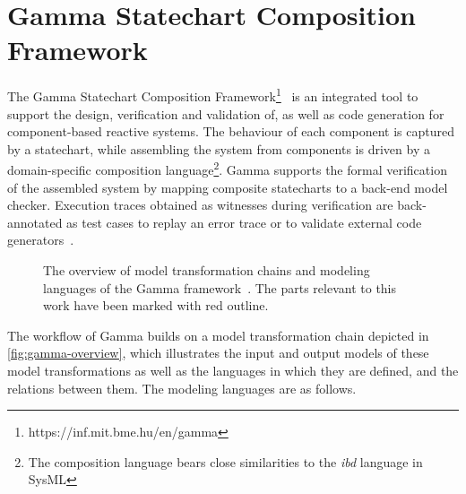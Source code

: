 \section{Gamma Statechart Composition Framework}\label{sec:gamma}

The Gamma Statechart Composition Framework\footnote{https://inf.mit.bme.hu/en/gamma}~\cite{mixed_statecharts_2020} is an integrated tool to support the design, verification and validation of, as well as code generation for component-based reactive systems. The behaviour of each component is captured by a statechart, while assembling the system from components is driven by a domain-specific composition language\footnote{The composition language bears close similarities to the \emph{ibd} language in SysML}. Gamma supports the formal verification of the assembled system by mapping composite statecharts to a back-end model checker. Execution traces obtained as witnesses during verification are back-annotated as test cases to replay an error trace or to validate external code generators~\cite{molnar2018gamma}. 

\begin{figure}[!ht]
	\centering
	
	\caption{The overview of model transformation chains and modeling languages of the Gamma framework~\cite{mixed_statecharts_2020}. The parts relevant to this work have been marked with red outline.}
	\label{fig:gamma-overview}
\end{figure}

The workflow of Gamma builds on a model transformation chain depicted in \autoref{fig:gamma-overview}, which illustrates the input and output models of these model transformations as well as the languages in which they are defined, and the relations between them. The modeling languages are as follows.

